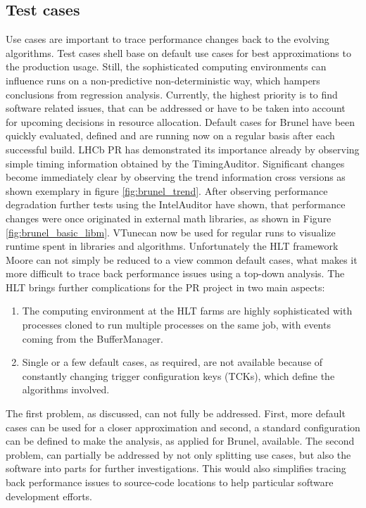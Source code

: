 \documentclass[a4paper]{jpconf}
\begin{document}
\subsection{Test cases}
\label{sec:test_cases}

Use cases are important to trace performance changes back to the evolving algorithms. Test cases shell base on default use cases for best approximations to the production usage. Still, the sophisticated computing environments can influence runs on a non-predictive non-deterministic way, which hampers conclusions from regression analysis. Currently, the highest priority is to find software related issues, that can be addressed or have to be taken into account for upcoming decisions in resource allocation.
\newline
Default cases for Brunel have been quickly evaluated, defined and are running now on a regular basis after each successful build. LHCb PR has demonstrated its importance already by observing simple timing information obtained by the TimingAuditor. Significant changes become immediately clear by observing the trend information cross versions as shown exemplary in figure \ref{fig:brunel_trend}. After observing performance degradation further tests using the IntelAuditor have shown, that performance changes were once originated in external math libraries, as shown in Figure \ref{fig:brunel_basic_libm}. VTune\texttrademark can now be used for regular runs to visualize runtime spent in libraries and algorithms.
\newline
Unfortunately the HLT framework Moore can not simply be reduced to a view common default cases, what makes it more difficult to trace back performance issues using a top-down analysis. The HLT brings further complications for the PR project in two main aspects:
\begin{enumerate}
 \item The computing environment at the HLT farms are highly sophisticated with processes cloned to run multiple processes on the same job, with events coming from the BufferManager.
 \item Single or a few default cases, as required, are not available because of constantly changing trigger configuration keys (TCKs), which define the algorithms involved.
\end{enumerate}
The first problem, as discussed, can not fully be addressed. First, more default cases can be used for a closer approximation and second, a standard configuration can be defined to make the analysis, as applied for Brunel, available. The second problem, can partially be addressed by not only splitting use cases, but also the software into parts for further investigations. This would also simplifies tracing back performance issues to source-code locations to help particular software development efforts. 
\end{document}
